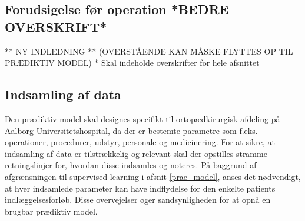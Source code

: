 \subsection{Forudsigelse før operation *BEDRE OVERSKRIFT*} 

** NY INDLEDNING **  (OVERSTÅENDE KAN MÅSKE FLYTTES OP TIL PRÆDIKTIV MODEL)
* Skal indeholde overskrifter for hele afsnittet



\subsection{Indsamling af data}
Den prædiktiv model skal designes specifikt til ortopædkirurgisk afdeling på Aalborg Universitetshospital, da der er bestemte parametre som f.eks. operationer, procedurer, udstyr, personale og medicinering. For at sikre, at indsamling af data er tilstrækkelig og relevant skal der opstilles stramme retningslinjer for, hvordan disse indsamles og noteres. På baggrund af afgrænsningen til supervised learning i afsnit \ref{prae_model}, anses det nødvendigt, at hver indsamlede parameter kan have indflydelse for den enkelte patients indlæggelsesforløb. Disse overvejelser øger sandsynligheden for at opnå en brugbar prædiktiv model. 


